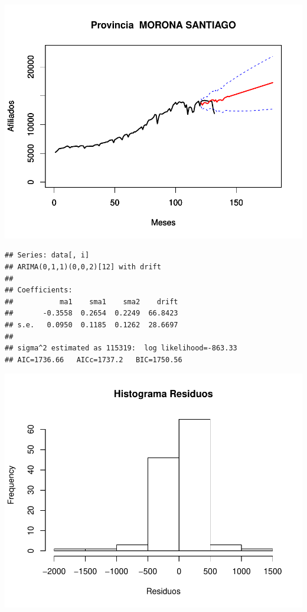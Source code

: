 \documentclass[11pt,a4paper,oneside]{article}\usepackage[]{graphicx}\usepackage[]{color}
\makeatletter
\def\maxwidth{ %
  \ifdim\Gin@nat@width>\linewidth
    \linewidth
  \else
    \Gin@nat@width
  \fi
}
\newenvironment{kframe}{%
 \def\at@end@of@kframe{}%
 \ifinner\ifhmode%
  \def\at@end@of@kframe{\end{minipage}}%
  \begin{minipage}{\columnwidth}%
 \fi\fi%
 \def\FrameCommand##1{\hskip\@totalleftmargin \hskip-\fboxsep
 \colorbox{shadecolor}{##1}\hskip-\fboxsep
     \hskip-\linewidth \hskip-\@totalleftmargin \hskip\columnwidth}%
 \MakeFramed {\advance\hsize-\width
   \@totalleftmargin\z@ \linewidth\hsize
   \@setminipage}}%
 {\par\unskip\endMakeFramed%
 \at@end@of@kframe}
\newenvironment{knitrout}{}{} %
\makeatother
\begin{document}
\begin{knitrout}
{\centering \includegraphics[width=\maxwidth]{figure/unnamed-chunk-16-43} 

}


\begin{kframe}\begin{verbatim}
## Series: data[, i] 
## ARIMA(0,1,1)(0,0,2)[12] with drift         
## 
## Coefficients:
##           ma1    sma1    sma2    drift
##       -0.3558  0.2654  0.2249  66.8423
## s.e.   0.0950  0.1185  0.1262  28.6697
## 
## sigma^2 estimated as 115319:  log likelihood=-863.33
## AIC=1736.66   AICc=1737.2   BIC=1750.56
\end{verbatim}
\end{kframe}

{\centering \includegraphics[width=\maxwidth]{figure/unnamed-chunk-16-44} 

}
\end{knitrout}
\end{document}
